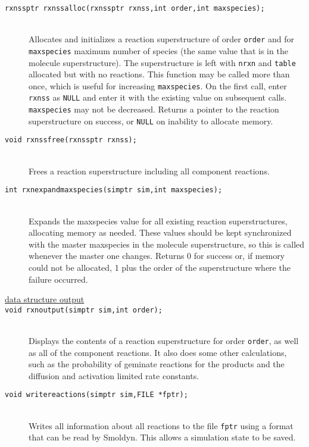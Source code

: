 \documentclass {book}
\begin{document}
\begin{description}
\item[\texttt{rxnssptr rxnssalloc(rxnssptr rxnss,int order,int maxspecies);}]
\hfill \\
Allocates and initializes a reaction superstructure of order \texttt{order} and for \texttt{maxspecies} maximum number of species (the same value that is in the molecule superstructure).  The superstructure is left with \texttt{nrxn} and \texttt{table} allocated but with no reactions.  This function may be called more than once, which is useful for increasing \texttt{maxspecies}.  On the first call, enter \texttt{rxnss} as \texttt{NULL} and enter it with the existing value on subsequent calls.  \texttt{maxspecies} may not be decreased.  Returns a pointer to the reaction superstructure on success, or \texttt{NULL} on inability to allocate memory.

\item[\texttt{void rxnssfree(rxnssptr rxnss);}]
\hfill \\
Frees a reaction superstructure including all component reactions.

\item[\texttt{int rxnexpandmaxspecies(simptr sim,int maxspecies);}]
\hfill \\
Expands the maxspecies value for all existing reaction superstructures, allocating memory as needed.  These values should be kept synchronized with the master maxspecies in the molecule superstructure, so this is called whenever the master one changes.  Returns 0 for success or, if memory could not be allocated, 1 plus the order of the superstructure where the failure occurred.

\item[\underline{data structure output}]

\item[\texttt{void rxnoutput(simptr sim,int order);}]
\hfill \\
Displays the contents of a reaction superstructure for order \texttt{order}, as well as all of the component reactions.  It also does some other calculations, such as the probability of geminate reactions for the products and the diffusion and activation limited rate constants.

\item[\texttt{void writereactions(simptr sim,FILE *fptr);}]
\hfill \\
Writes all information about all reactions to the file \texttt{fptr} using a format that can be read by Smoldyn.  This allows a simulation state to be saved.


\end{description}
\end{document}
